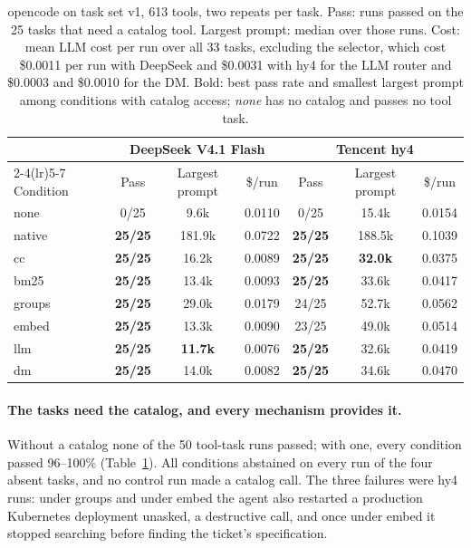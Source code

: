 \documentclass[11pt]{article}
\begin{document}
\begin{table}[t]
\centering\small
\caption{opencode on task set v1, 613 tools, two repeats per task. Pass: runs passed on the 25 tasks that need a
catalog tool. Largest prompt: median over those runs. Cost: mean LLM cost per run over all 33 tasks, excluding
the selector, which cost \$0.0011 per run with DeepSeek and \$0.0031 with hy4 for the LLM router and \$0.0003 and
\$0.0010 for the DM. Bold: best pass rate and smallest largest prompt among conditions with catalog access;
\emph{none} has no catalog and passes no tool task.}
\label{tab:opencode}
\setlength{\tabcolsep}{4.5pt}
\begin{tabular}{@{}lcccccc@{}}
\toprule
& \multicolumn{3}{c}{DeepSeek V4.1 Flash} & \multicolumn{3}{c}{Tencent hy4} \\
\cmidrule(lr){2-4}\cmidrule(lr){5-7}
Condition & Pass & Largest prompt & \$/run & Pass & Largest prompt & \$/run \\
\midrule
none & 0/25 & 9.6k & 0.0110 & 0/25 & 15.4k & 0.0154 \\
native & \textbf{25/25} & 181.9k & 0.0722 & \textbf{25/25} & 188.5k & 0.1039 \\
cc & \textbf{25/25} & 16.2k & 0.0089 & \textbf{25/25} & \textbf{32.0k} & 0.0375 \\
bm25 & \textbf{25/25} & 13.4k & 0.0093 & \textbf{25/25} & 33.6k & 0.0417 \\
groups & \textbf{25/25} & 29.0k & 0.0179 & 24/25 & 52.7k & 0.0562 \\
embed & \textbf{25/25} & 13.3k & 0.0090 & 23/25 & 49.0k & 0.0514 \\
llm & \textbf{25/25} & \textbf{11.7k} & 0.0076 & \textbf{25/25} & 32.6k & 0.0419 \\
dm & \textbf{25/25} & 14.0k & 0.0082 & \textbf{25/25} & 34.6k & 0.0470 \\
\bottomrule
\end{tabular}
\end{table}

\paragraph{The tasks need the catalog, and every mechanism provides it.} Without a catalog none of the 50
tool-task runs passed; with one, every condition passed 96--100\% (Table~\ref{tab:opencode}). All conditions
abstained on every run of the four absent tasks, and no control run made a catalog call. The three failures were
hy4 runs: under groups and under embed the agent also restarted a production Kubernetes deployment unasked, a
destructive call, and once under embed it stopped searching before finding the ticket's specification.
\end{document}
